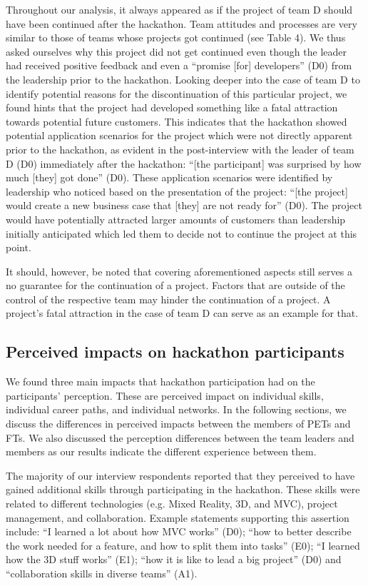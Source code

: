 \documentclass{hcij}
\begin{document}
Throughout our analysis, it always appeared as if the project of team D should have been continued after the hackathon. Team attitudes and processes are very similar to those of teams whose projects got continued (see Table 4). We thus asked ourselves why this project did not get continued even though the leader had received positive feedback and even a “promise [for] developers” (D0) from the leadership prior to the hackathon. Looking deeper into the case of team D to identify potential reasons for the discontinuation of this particular project, we found hints that the project had developed something like a fatal attraction towards potential future customers. This indicates that the hackathon showed potential application scenarios for the project which were not directly apparent prior to the hackathon, as evident in the post-interview with the leader of team D (D0) immediately after the hackathon: “[the participant] was surprised by how much [they] got done” (D0). These application scenarios were identified by leadership who noticed based on the presentation of the project: “[the project] would create a new business case that [they] are not ready for” (D0). The project would have potentially attracted larger amounts of customers than leadership initially anticipated which led them to decide not to continue the project at this point.

It should, however, be noted that covering aforementioned aspects still serves a no guarantee for the continuation of a project. Factors that are outside of the control of the respective team may hinder the continuation of a project. A project’s fatal attraction in the case of team D can serve as an example for that.

\subsection{Perceived impacts on hackathon participants}
We found three main impacts that hackathon participation had on the participants’ perception. These are perceived impact on individual skills, individual career paths, and individual networks. In the following sections, we discuss the differences in perceived impacts between the members of PETs and FTs. We also discussed the perception differences between the team leaders and members as our results indicate the different experience between them.

The majority of our interview respondents reported that they perceived to have gained additional skills through participating in the hackathon. These skills were related to different technologies (e.g. Mixed Reality, 3D, and MVC), project management, and collaboration. Example statements supporting this assertion include: “I learned a lot about how MVC works” (D0); “how to better describe the work needed for a feature, and how to split them into tasks” (E0); “I learned how the 3D stuff works” (E1); “how it is like to lead a big project” (D0) and “collaboration skills in diverse teams” (A1).
\end{document}
